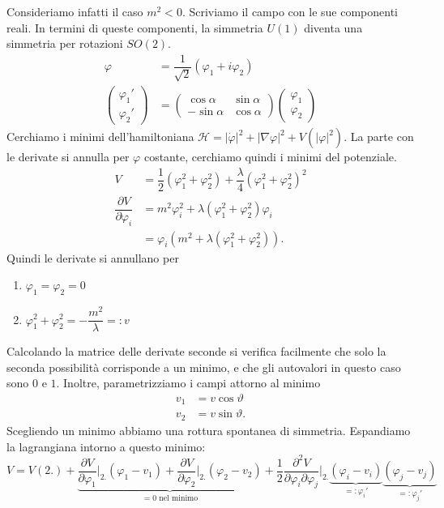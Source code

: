 \documentclass[italian,a4paper]{article}
\theoremstyle{definition}
\renewcommand{\theta}{\vartheta}
\begin{document}
Consideriamo infatti il caso $m^2 < 0$.
Scriviamo il campo con le sue componenti reali. In termini di queste
componenti, la simmetria $U(1)$ diventa una simmetria per rotazioni $SO(2)$.
\begin{align*}
    \varphi &= \dfrac{1}{\sqrt{2}}(\varphi_1 + i \varphi_2)\\
    \begin{pmatrix}
        \varphi_1'\\
        \varphi_2'
    \end{pmatrix} &= 
    \begin{pmatrix}
        \cos \alpha & \sin \alpha \\
        -\sin \alpha & \cos \alpha
    \end{pmatrix}
    \begin{pmatrix}
        \varphi_1\\
        \varphi_2
    \end{pmatrix}
\end{align*}
Cerchiamo i minimi dell'hamiltoniana $\mathscr H = |\dot\varphi|^2 + |\nabla
\varphi|^2 + V(|\varphi|^2)$. La parte con le derivate si annulla per
$\varphi$ costante, cerchiamo quindi i minimi del potenziale.
\begin{align*}
    V &=\dfrac{1}{2}(\varphi_1^2 + \varphi_2^2) +
    \dfrac{\lambda}{4}(\varphi_1^2 + \varphi_2^2)^2\\
    \dfrac{\partial V}{\partial \varphi_i} &= m^2 \varphi_i ^ 2 +
    \lambda(\varphi_1^2 + \varphi_2^2)\varphi_i\\
    &= \varphi_i (m^2 + \lambda(\varphi_1^2 + \varphi_2^2)).
\end{align*}
Quindi le derivate si annullano per 
\begin{enumerate}
    \item $\varphi_1 = \varphi_2 = 0$
    \item $\varphi_1^2 + \varphi_2^2 = - \dfrac{m^2}{\lambda} = \mathop: v$
\end{enumerate}
Calcolando la matrice delle derivate
seconde si verifica facilmente che solo la seconda possibilit\`a corrisponde
a un minimo, e che gli autovalori in questo caso sono $0$ e $1$. Inoltre,
parametrizziamo i campi attorno al minimo
\begin{align*}
    v_1 &=v \cos \theta\\
    v_2 &=v \sin \theta.
\end{align*}
Scegliendo un minimo abbiamo una rottura spontanea di simmetria. Espandiamo
la lagrangiana intorno a questo minimo:
\begin{equation*}
    V = V(2.)
    + \underbrace{\dfrac{\partial V}{\partial \varphi_1}\rvert_{2.}(\varphi_1 - v_1)
    + \dfrac{\partial V}{\partial \varphi_2}\rvert_{2.}(\varphi_2 -
    v_2)}_{= 0\text{ nel minimo}}
    + \dfrac{1}{2}\dfrac{\partial^2 V}{\partial \varphi_i\partial \varphi_j}|_{2.}
    \underbrace{(\varphi_i - v_i)}_{=\mathop:\varphi_i'}\underbrace{(\varphi_j -
    v_j)}_{=\mathop:\varphi_j'}
\end{equation*}
\end{document}

